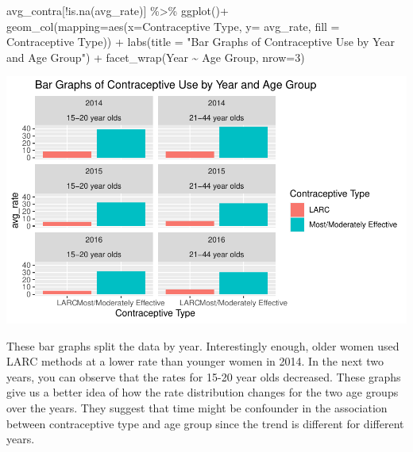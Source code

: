 \documentclass[
]{article}
\newenvironment{Shaded}{\begin{snugshade}}{\end{snugshade}}
\newcommand{\AttributeTok}[1]{\textcolor[rgb]{0.77,0.63,0.00}{#1}}
\newcommand{\DecValTok}[1]{\textcolor[rgb]{0.00,0.00,0.81}{#1}}
\newcommand{\FunctionTok}[1]{\textcolor[rgb]{0.00,0.00,0.00}{#1}}
\newcommand{\NormalTok}[1]{#1}
\newcommand{\SpecialCharTok}[1]{\textcolor[rgb]{0.00,0.00,0.00}{#1}}
\newcommand{\StringTok}[1]{\textcolor[rgb]{0.31,0.60,0.02}{#1}}
\begin{document}
\begin{Shaded}
\begin{Highlighting}[]
\NormalTok{avg\_contra[}\SpecialCharTok{!}\FunctionTok{is.na}\NormalTok{(}\StringTok{\textasciigrave{}}\AttributeTok{avg\_rate}\StringTok{\textasciigrave{}}\NormalTok{)] }\SpecialCharTok{\%\textgreater{}\%} 
  \FunctionTok{ggplot}\NormalTok{()}\SpecialCharTok{+}
  \FunctionTok{geom\_col}\NormalTok{(}\AttributeTok{mapping=}\FunctionTok{aes}\NormalTok{(}\AttributeTok{x=}\StringTok{\textasciigrave{}}\AttributeTok{Contraceptive Type}\StringTok{\textasciigrave{}}\NormalTok{, }\AttributeTok{y=} \StringTok{\textasciigrave{}}\AttributeTok{avg\_rate}\StringTok{\textasciigrave{}}\NormalTok{, }\AttributeTok{fill =} \StringTok{\textasciigrave{}}\AttributeTok{Contraceptive Type}\StringTok{\textasciigrave{}}\NormalTok{)) }\SpecialCharTok{+}
   \FunctionTok{labs}\NormalTok{(}\AttributeTok{title =} \StringTok{"Bar Graphs of Contraceptive Use by Year and Age Group"}\NormalTok{) }\SpecialCharTok{+}
   \FunctionTok{facet\_wrap}\NormalTok{(Year }\SpecialCharTok{\textasciitilde{}} \StringTok{\textasciigrave{}}\AttributeTok{Age Group}\StringTok{\textasciigrave{}}\NormalTok{, }\AttributeTok{nrow=}\DecValTok{3}\NormalTok{)}
\end{Highlighting}
\end{Shaded}

\begin{center}\includegraphics[width=700px]{Report_files/figure-latex/unnamed-chunk-7-1} \end{center}

These bar graphs split the data by year. Interestingly enough, older
women used LARC methods at a lower rate than younger women in 2014. In
the next two years, you can observe that the rates for 15-20 year olds
decreased. These graphs give us a better idea of how the rate
distribution changes for the two age groups over the years. They suggest
that time might be confounder in the association between contraceptive
type and age group since the trend is different for different years.
\end{document}
